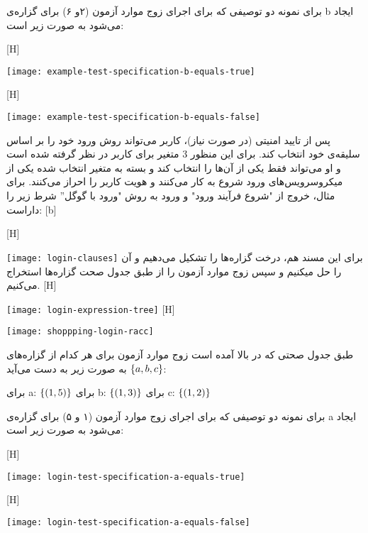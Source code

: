 برای نمونه دو توصیفی که برای اجرای زوج موارد آزمون (۲و ۶) برای گزاره‌ی b ایجاد می‌شود به صورت زیر است:



[H]
\raggedright
\texttt{[image: example-test-specification-b-equals-true]}
\vspace{0.5em}

[H]
\raggedright
\texttt{[image: example-test-specification-b-equals-false]}
\vspace{0.5em}



پس از تایید امنیتی (در صورت نیاز)، کاربر می‌تواند روش ورود خود را بر اساس سلیقه‌ی خود انتخاب کند. برای این منظور 3 متغیر برای کاربر در نظر گرفته شده‌ است و او می‌تواند فقط یکی از آن‌ها را انتخاب کند و بسته به متغیر انتخاب شده‌ یکی از میکروسرویس‌های ورود شروع به کار می‌کنند و هویت کاربر را احراز می‌کنند. برای مثال، خروج از "شروع فرآیند ورود" و ورود به روش‌ "ورود با گوگل'' شرط زیر را داراست:
[b]
\vspace{0.5em}


[H]
\raggedright
\texttt{[image: login-clauses]}
\vspace{0.5em}
برای این مسند هم، درخت گزاره‌ها را تشکیل می‌دهیم و آن را حل میکنیم و سپس زوج موارد آزمون را از طبق جدول صحت گزاره‌ها استخراج می‌کنیم.
[H]
\raggedright
\texttt{[image: login-expression-tree]}
\vspace{0.5em}
[H]
\raggedright
\texttt{[image: shoppping-login-racc]}
\vspace{0.5em}

طبق جدول صحتی که در بالا آمده است زوج‌ موارد آزمون برای هر کدام از گزاره‌های
$\left\{ a, b, c \right\}$
به صورت زیر به دست می‌آید:

 برای a: 
$\left\{ (1, 5) \right\}$
 برای b: 
$\left\{ (1, 3) \right\}$
 برای c: 
$\left\{ (1, 2) \right\}$

برای نمونه دو توصیفی که برای اجرای زوج موارد آزمون (۱ و ۵) برای گزاره‌ی a ایجاد می‌شود به صورت زیر است:



[H]
\raggedright
\texttt{[image: login-test-specification-a-equals-true]}
\vspace{0.5em}

[H]
\raggedright
\texttt{[image: login-test-specification-a-equals-false]}
\vspace{0.5em}

  
